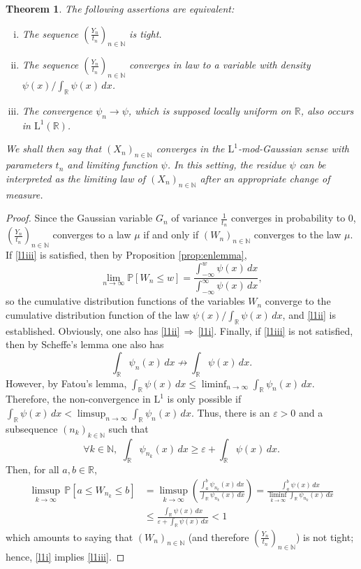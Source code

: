 \documentclass[12pt,a4paper,reqno]{amsart}
\newcommand{\N}{\mathbb{N}}
\newcommand{\R}{\mathbb{R}}
\newcommand{\proba}{\mathbb{P}}
\newcommand{\eps}{\varepsilon}
\newtheorem{theorem}{Theorem}
\theoremstyle{remark}
\begin{document}
\begin{theorem}\label{thm:mainl1}
The following assertions are equivalent:\vspace{2mm}
\begin{enumerate}[(i)]
\item The sequence $(\frac{Y_n}{t_n})_{n \in \N}$ is tight.\label{l1i}\vspace{1mm}
\item The sequence $(\frac{Y_n}{t_n})_{n \in \N}$ converges in law to a variable with density $\psi(x)/\int_{\R}\psi(x)\,dx$.\label{l1ii}\vspace{1mm}
\item The convergence $\psi_n \to \psi$, which is supposed locally uniform on $\R$, also occurs in $\mathrm{L}^1(\R)$.\label{l1iii}\vspace{1mm}
\end{enumerate}
We shall then say that $(X_n)_{n \in \N}$ converges in the $\mathrm{L}^1$-mod-Gaussian sense with parameters $t_n$ and limiting function $\psi$. In this setting, the residue $\psi$ can be interpreted as the limiting law of $(X_n)_{n \in \N}$ after an appropriate change of measure.
\end{theorem}

\begin{proof}
Since the Gaussian variable $G_n$ of variance $\frac{1}{t_n}$ converges in probability to $0$, $(\frac{Y_n}{t_n})_{n \in \N}$ converges to a law $\mu$ if and only if $(W_n)_{n \in \N}$ converges to the law $\mu$. If \eqref{l1iii} is satisfied, then by Proposition \ref{prop:enlemma},
$$\lim_{n \to \infty} \proba[W_n \leq w] = \frac{\int_{-\infty}^w \psi(x)\,dx}{\int_{-\infty}^\infty \psi(x)\,dx},$$
so the cumulative distribution functions of the variables $W_n$ converge to the cumulative distribution function of the law $\psi(x)/\int_{\R}\psi(x)\,dx$, and \eqref{l1ii} is established. Obviously, one  also has \eqref{l1ii}$\,\Rightarrow\,$\eqref{l1i}. Finally, if \eqref{l1iii} is not satisfied, then by Scheffe's lemma one  also has
$$\int_{\R}\psi_n(x)\,dx\not\to  \int_{\R}\psi(x)\,dx.$$
However, by Fatou's lemma, $\int_{\R} \psi(x)\,dx \leq \liminf_{n \to \infty} \int_{\R}\psi_n(x)\,dx$. Therefore, the non-convergence in $\mathrm{L}^1$ is only possible if $\int_{\R} \psi(x)\,dx < \limsup_{n \to \infty} \int_{\R}\psi_n(x)\,dx$. Thus, there is an $\eps>0$ and a subsequence $(n_k)_{k \in \N}$ such that
$$\forall k \in \N,\,\,\int_{\R} \psi_{n_k}(x)\,dx \geq \eps + \int_\R \psi(x)\,dx.$$
Then, for all $a,b \in \R$,
\begin{align*}\limsup_{k \to \infty} \,\proba[a \leq W_{n_k} \leq b] &= \limsup_{k \to \infty}\left(\frac{\int_a^b \psi_{n_k}(x)\,dx}{\int_{\R} \psi_{n_k}(x)\,dx} \right) = \frac{\int_a^b \psi(x)\,dx}{\liminf_{k \to \infty} \int_\R \psi_{n_k}(x)\,dx}\\
& \leq \frac{\int_{\R} \psi(x)\,dx}{\eps+\int_{\R} \psi(x)\,dx}<1
\end{align*}
which amounts to saying that $(W_n)_{n \in \N}$ (and therefore $(\frac{Y_n}{t_n})_{n \in \N}$) is not tight; hence, \eqref{l1i} implies \eqref{l1iii}.
\end{proof}
\bigskip
\end{document}
